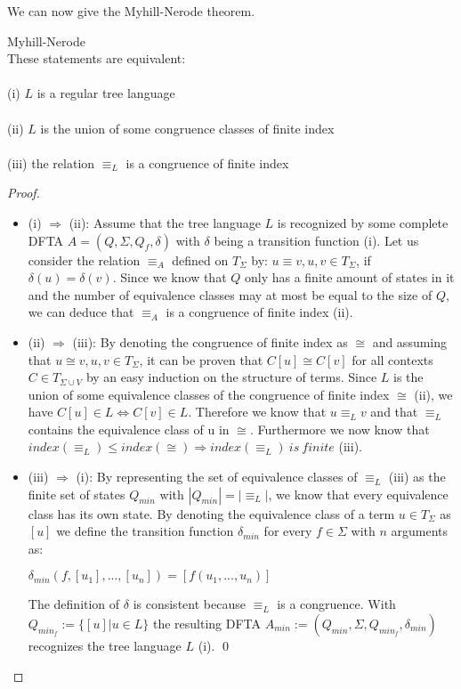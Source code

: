 \documentclass{llncs}
\begin{document}
\newpage

\noindent
We can now give the Myhill-Nerode theorem.

\begin{theorem}{Myhill-Nerode} \cite{tata-nfta}\\
	These statements are equivalent:\\\\
	(i) \(L\) is a regular tree language\\\\
	(ii) \(L\) is the union of some congruence classes of finite index\\\\
	(iii) the relation \(\equiv_L\) is a congruence of finite index
\end{theorem}

\begin{proof}{~}
	\begin{itemize}
		\item (i) \(\Rightarrow\) (ii): Assume that the tree language \(L\) is recognized by some complete DFTA \(A = (Q, \Sigma, Q_f, \delta)\) with \(\delta\) being a transition function (i).
		Let us consider the relation \(\equiv_A\) defined on \(T_\Sigma\) by: \(u \equiv v, u,v \in T_\Sigma\), if \(\delta(u) = \delta(v)\). Since we know that \(Q\) only has a finite amount of states in it and the number of equivalence classes may at most be equal to the size of \(Q\), we can deduce that \(\equiv_A\) is a congruence of finite index (ii).
		\\
		\item (ii) \(\Rightarrow\) (iii): By denoting the congruence of finite index as \(\cong\) and assuming that \(u \cong v, u,v \in T_\Sigma\), it can be proven that \(C[u] \cong C[v]\) for all contexts \(C \in T_{\Sigma \cup V} \) by an easy induction on the structure of terms. Since \(L\) is the union of some equivalence classes of the congruence of finite index \(\cong\) (ii), we have \(C[u] \in L \iff C[v] \in L \). Therefore we know that  \( u \equiv_L v \) and that \( \equiv_L \) contains the equivalence class of u in \( \cong \). Furthermore we now know that \(index(\equiv_L) \leq index(\cong) \Rightarrow index(\equiv_L)~is~finite \) (iii).
		\\
		\item (iii) \(\Rightarrow\) (i):
		 By representing the set of equivalence classes of \( \equiv_L \) (iii) as the finite set of states \(Q_{min}\) with \(|Q_{min}| = |\equiv_L|\), we know that every equivalence class has its own state. By denoting the equivalence class of a term \(u \in T_\Sigma\) as \([u]\) we define the transition function \(\delta_{min}\) for every \( f \in \Sigma\) with \(n\) arguments as:
		 \begin{center}
			 \(\delta_{min}(f, [u_1], ..., [u_n]) = [f(u_1, ..., u_n)]\)
		 \end{center}
		 The definition of \(\delta\) is consistent because \(\equiv_L\) is a congruence. With \(Q_{min_f} := \{ [u] | u \in L \}\) the resulting DFTA \(A_{min} := (Q_{min}, \Sigma, Q_{min_f}, \delta_{min})\) recognizes the tree language \(L\) (i). 
		 \qed
	\end{itemize}
\end{proof}
\end{document}
